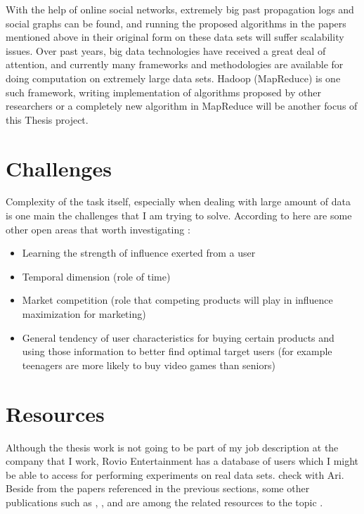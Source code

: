 \documentclass[english]{tktltiki}
\begin{document}
With the help of online social networks, extremely big past propagation logs and social graphs can be found, and running the proposed algorithms in the papers mentioned above in their original form on these data sets will suffer scalability issues. Over past years, big data technologies have received a great deal of attention, and currently many frameworks and methodologies are available for doing computation on extremely large data sets. Hadoop (MapReduce) is one such framework, writing implementation of algorithms proposed by other researchers or a completely new algorithm in MapReduce will be another focus of this Thesis project. 

\section{Challenges}
Complexity of the task itself, especially when dealing with large amount of data is one main the challenges that I am trying to solve. 
According to \cite{Bon11} here are some other open areas that worth investigating :
\begin{itemize}
\item Learning the strength of influence exerted from a user
\item Temporal dimension (role of time)
\item Market competition (role that competing products will play in influence maximization for marketing)
\item General tendency of user characteristics for buying certain products and using those information to better find optimal target users (for example teenagers are more likely to buy video games than seniors)
\end{itemize}

\section{Resources}
Although the thesis work is not going to be part of my job description at the company that I work, Rovio Entertainment has a database of users which I might be able to access for performing experiments on real data sets. {check with Ari}.
Beside from the papers referenced in the previous sections, some other publications such as \cite{domingo02}, \cite{goyal10}, and \cite{cheng13} are among the related resources to the topic .\\
\pagebreak



\lastpage

\pagestyle{empty}
\end{document}
